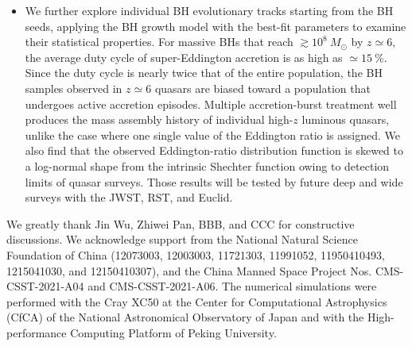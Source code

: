 \documentclass[twocolumn, twocolappendix]{aastex63}
\newcommand{\Msun}{M_\odot}
\begin{document}
\begin{CJK*}{UTF8}{gbsn}
\begin{itemize}
\item
We further explore individual BH evolutionary tracks starting from the BH seeds, applying the BH growth model
with the best-fit parameters to examine their statistical properties.
For massive BHs that reach $\gtrsim 10^8~\Msun$ by $z\simeq 6$, the average duty cycle of super-Eddington accretion is as high as $\simeq 15~\%$.
Since the duty cycle is nearly twice that of the entire population, the BH samples observed in $z\simeq 6$ quasars are
biased toward a population that undergoes active accretion episodes.
Multiple accretion-burst treatment well produces the mass assembly history of individual high-$z$ luminous quasars,
unlike the case where one single value of the Eddington ratio is assigned.
We also find that the observed Eddington-ratio distribution function is skewed to a log-normal shape from the intrinsic Shechter function
owing to detection limits of quasar surveys.
Those results will be tested by future deep and wide surveys with the JWST, RST, and Euclid.
\end{itemize}

\acknowledgments
We greatly thank Jin Wu, Zhiwei Pan, BBB, and CCC for constructive discussions. 
We acknowledge support from the National Natural Science Foundation of China 
(12073003, 12003003, 11721303, 11991052, 11950410493, 1215041030, and 12150410307), 
and the China Manned Space Project Nos. CMS-CSST-2021-A04 and CMS-CSST-2021-A06. 
The numerical simulations were performed with the Cray XC50 at the Center for Computational Astrophysics (CfCA) 
of the National Astronomical Observatory of Japan and with the High-performance Computing Platform of Peking University.
%





\end{CJK*}
\end{document}
